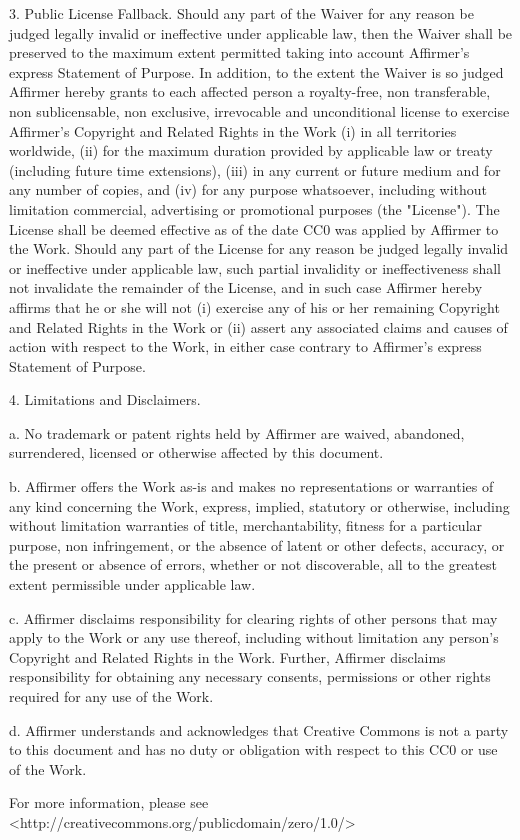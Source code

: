 \documentclass[10pt,letterpaper,twoside]{book}
\begin{document}
3. Public License Fallback. Should any part of the Waiver for any reason be
judged legally invalid or ineffective under applicable law, then the Waiver
shall be preserved to the maximum extent permitted taking into account
Affirmer's express Statement of Purpose. In addition, to the extent the Waiver
is so judged Affirmer hereby grants to each affected person a royalty-free,
non transferable, non sublicensable, non exclusive, irrevocable and
unconditional license to exercise Affirmer's Copyright and Related Rights in
the Work (i) in all territories worldwide, (ii) for the maximum duration
provided by applicable law or treaty (including future time extensions), (iii)
in any current or future medium and for any number of copies, and (iv) for any
purpose whatsoever, including without limitation commercial, advertising or
promotional purposes (the "License"). The License shall be deemed effective as
of the date CC0 was applied by Affirmer to the Work. Should any part of the
License for any reason be judged legally invalid or ineffective under
applicable law, such partial invalidity or ineffectiveness shall not
invalidate the remainder of the License, and in such case Affirmer hereby
affirms that he or she will not (i) exercise any of his or her remaining
Copyright and Related Rights in the Work or (ii) assert any associated claims
and causes of action with respect to the Work, in either case contrary to
Affirmer's express Statement of Purpose.

4. Limitations and Disclaimers.

  a. No trademark or patent rights held by Affirmer are waived, abandoned,
  surrendered, licensed or otherwise affected by this document.

  b. Affirmer offers the Work as-is and makes no representations or warranties
  of any kind concerning the Work, express, implied, statutory or otherwise,
  including without limitation warranties of title, merchantability, fitness
  for a particular purpose, non infringement, or the absence of latent or
  other defects, accuracy, or the present or absence of errors, whether or not
  discoverable, all to the greatest extent permissible under applicable law.

  c. Affirmer disclaims responsibility for clearing rights of other persons
  that may apply to the Work or any use thereof, including without limitation
  any person's Copyright and Related Rights in the Work. Further, Affirmer
  disclaims responsibility for obtaining any necessary consents, permissions
  or other rights required for any use of the Work.

  d. Affirmer understands and acknowledges that Creative Commons is not a
  party to this document and has no duty or obligation with respect to this
  CC0 or use of the Work.

For more information, please see
<http://creativecommons.org/publicdomain/zero/1.0/>
\end{document}
